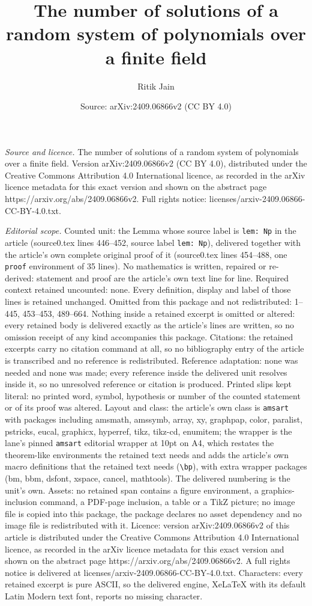 \documentclass[10pt,a4paper]{amsart}
\title[The number of solutions of a random system of polynomials ov]{The number of solutions of a random system of polynomials over a finite field}
\author{Ritik Jain}
\date{Source: arXiv:2409.06866v2 (CC BY 4.0)}
\begin{document}
\maketitle

\noindent\emph{Source and licence.} The number of solutions of a random system of polynomials over a finite field. Version arXiv:2409.06866v2 (CC BY 4.0), distributed under the Creative Commons Attribution 4.0 International licence, as recorded in the arXiv licence metadata for this exact version and shown on the abstract page https://arxiv.org/abs/2409.06866v2. Full rights notice: licenses/arxiv-2409.06866-CC-BY-4.0.txt.\par\smallskip

\noindent\textit{Editorial scope.} Counted unit: the Lemma whose source label is \texttt{lem: Np} in the article (source0.tex lines 446--452, source label \texttt{lem: Np}), delivered together with the article's own complete original proof of it (source0.tex lines 454--488, one \texttt{proof} environment of 35 lines). No mathematics is written, repaired or re-derived: statement and proof are the article's own text line for line. Required context retained uncounted: none. Every definition, display and label of those lines is retained unchanged. Omitted from this package and not redistributed: 1--445, 453--453, 489--664. Nothing inside a retained excerpt is omitted or altered: every retained body is delivered exactly as the article's lines are written, so no omission receipt of any kind accompanies this package. Citations: the retained excerpts carry no citation command at all, so no bibliography entry of the article is transcribed and no reference is redistributed. Reference adaptation: none was needed and none was made; every reference inside the delivered unit resolves inside it, so no unresolved reference or citation is produced. Printed slips kept literal: no printed word, symbol, hypothesis or number of the counted statement or of its proof was altered. Layout and class: the article's own class is \texttt{amsart} with packages including amsmath, amssymb, array, xy, graphpap, color, paralist, pstricks, eucal, graphicx, hyperref, tikz, tikz-cd, enumitem; the wrapper is the lane's pinned \texttt{amsart} editorial wrapper at 10pt on A4, which restates the theorem-like environments the retained text needs and adds the article's own macro definitions that the retained text needs (\texttt{\textbackslash bp}), with extra wrapper packages (bm, bbm, dsfont, xspace, cancel, mathtools). The delivered numbering is the unit's own. Assets: no retained span contains a figure environment, a graphics-inclusion command, a PDF-page inclusion, a table or a TikZ picture; no image file is copied into this package, the package declares no asset dependency and no image file is redistributed with it. Licence: version arXiv:2409.06866v2 of this article is distributed under the Creative Commons Attribution 4.0 International licence, as recorded in the arXiv licence metadata for this exact version and shown on the abstract page https://arxiv.org/abs/2409.06866v2. A full rights notice is delivered at licenses/arxiv-2409.06866-CC-BY-4.0.txt. Characters: every retained excerpt is pure ASCII, so the delivered engine, XeLaTeX with its default Latin Modern text font, reports no missing character.
\end{document}
